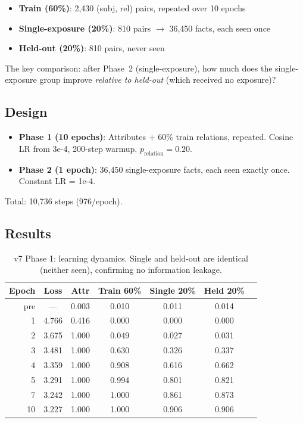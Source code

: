 \documentclass[11pt]{article}
\begin{document}
\begin{itemize}
\item \textbf{Train (60\%)}: 2,430 (subj, rel) pairs, repeated over 10 epochs
\item \textbf{Single-exposure (20\%)}: 810 pairs $\to$ 36,450 facts, each seen once
\item \textbf{Held-out (20\%)}: 810 pairs, never seen
\end{itemize}

The key comparison: after Phase~2 (single-exposure), how much does the single-exposure
group improve \emph{relative to held-out} (which received no exposure)?

\subsection{Design}

\begin{itemize}
\item \textbf{Phase 1 (10 epochs)}: Attributes + 60\% train relations, repeated.
  Cosine LR from 3e-4, 200-step warmup.  $p_\text{relation} = 0.20$.
\item \textbf{Phase 2 (1 epoch)}: 36,450 single-exposure facts, each seen exactly
  once.  Constant LR = 1e-4.
\end{itemize}

Total: 10,736 steps (976/epoch).

\subsection{Results}

\begin{table}[h]
\centering
\caption{v7 Phase 1: learning dynamics. Single and held-out are identical (neither
seen), confirming no information leakage.}
\label{tab:v7p1}
\begin{tabular}{rcccccc}
\toprule
Epoch & Loss & Attr & Train 60\% & Single 20\% & Held 20\% \\
\midrule
pre & --- & 0.003 & 0.010 & 0.011 & 0.014 \\
1 & 4.766 & 0.416 & 0.000 & 0.000 & 0.000 \\
2 & 3.675 & 1.000 & 0.049 & 0.027 & 0.031 \\
3 & 3.481 & 1.000 & 0.630 & 0.326 & 0.337 \\
4 & 3.359 & 1.000 & 0.908 & 0.616 & 0.662 \\
5 & 3.291 & 1.000 & 0.994 & 0.801 & 0.821 \\
7 & 3.242 & 1.000 & 1.000 & 0.861 & 0.873 \\
10 & 3.227 & 1.000 & 1.000 & 0.906 & 0.906 \\
\bottomrule
\end{tabular}
\end{table}
\end{document}
